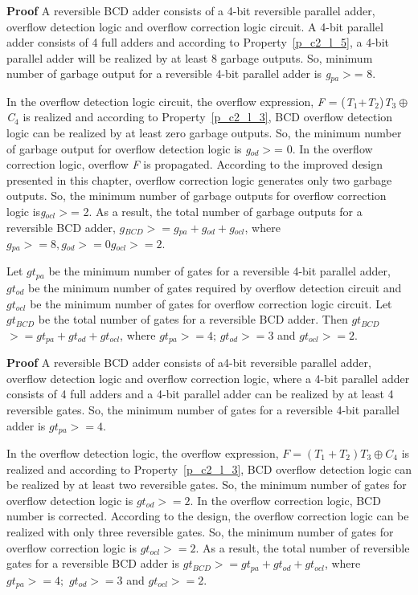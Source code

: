 \noindent\textbf{Proof}
A reversible BCD adder consists of a 4-bit reversible parallel adder, overflow detection logic and overflow correction logic circuit. A {4}-bit parallel adder consists of 4 full adders and according to Property~\ref{p_c2_l_5}, a {4}-bit parallel adder will be realized by at least 8 garbage outputs. So, minimum number of garbage output for a reversible 4-bit parallel adder is {\it g}${}_{pa}$${>}$= 8.

In the overflow detection logic circuit, the overflow expression, {\it F }= ({\it T}${}_{1}$+{\it T}${}_{2}$){\it T}${}_{3}\oplus$ {\it C}${}_{4}$ is realized and according to Property~\ref{p_c2_l_3}, BCD overflow detection logic can be realized by at least zero garbage outputs. So, the minimum number of garbage output for overflow detection logic is {\it g}${}_{od}$${>}$= 0. In the overflow correction logic, overflow {\it F }is propagated. According to the improved design presented in this chapter, overflow correction logic generates only two garbage outputs. So, the minimum number of garbage outputs for overflow correction logic is{\it g}${}_{ocl}$${>}$= 2.
As a result, the total number of garbage outputs for a reversible BCD adder, $g{}_{BCD}$${>}= g{}_{pa} + g{}_{od} + g{}_{ocl}$, where $g{}_{pa}{>}= 8, g{}_{od}{>}= 0 g{}_{ocl}{>}=  2$.


\begin{property}\label{p_c2_l_7}\textnormal{
		Let $gt_{pa}$ be the minimum number of gates for a reversible 4-bit parallel adder, $gt{}_{od}$ be the minimum number of gates required by overflow detection circuit and $gt{}_{ocl}$ be the minimum number of gates for overflow correction logic circuit. Let $gt{}_{BCD}$ be the total number of gates for a reversible BCD adder. Then	
		$gt{}_{BCD}$${>}= gt{}_{pa}+gt{}_{od}+gt{}_{ocl}$, where $gt{}_{pa}{>}= 4;\, gt{}_{od}{>}= 3$ and $gt{}_{ocl}{>}= 2.$}
\end{property}


\noindent\textbf{Proof}
A reversible BCD adder consists of a{4}-bit reversible parallel adder, overflow detection logic and overflow correction logic, where a {4}-bit parallel adder consists of 4 full adders and a {4}-bit parallel adder can be realized by at least 4 reversible gates. So, the minimum number of gates for a reversible {4}-bit parallel adder is $gt{}_{pa}$${>}= 4$.


In the overflow detection logic, the overflow expression, $F=(T{}_{1}+T{}_{2})T{}_{3}\oplus C{}_{4}$  is realized and according to Property~\ref{p_c2_l_3}, BCD overflow detection logic can be realized by at least two reversible gates. So, the minimum number of gates for overflow detection logic is $gt{}_{od}{>}= 2$. In the overflow correction logic, BCD number is corrected. According to the design, the overflow correction logic can be realized with only three reversible gates. So, the minimum number of gates for overflow correction logic is $gt{}_{ocl}{>}= 2$.
As a result, the total number of reversible gates for a reversible BCD adder is
$gt{}_{BCD}{>}= gt{}_{pa}+gt{}_{od}+gt{}_{ocl}$, where $gt{}_{pa}{>}= 4;$ $gt{}_{od}{>}= 3$ and $gt{}_{ocl}{>}= 2$.

